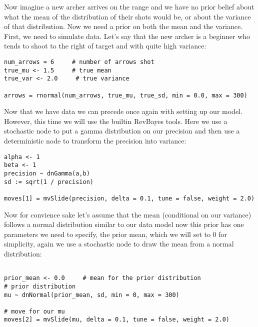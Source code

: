 Now imagine a new archer arrives on the range and we have no prior belief about what the mean of the distribution of their shots would be, or about the variance of that distribution. Now we need a prior on both the mean and the variance. First, we need to simulate data. Let's say that the new archer is a beginner who tends to shoot to the right of target and with quite high variance:

{\tt \begin{snugshade*}
\begin{lstlisting}
num_arrows = 6     # number of arrows shot
true_mu <- 1.5     # true mean
true_var <- 2.0     # true variance

arrows = rnormal(num_arrows, true_mu, true_sd, min = 0.0, max = 300)
\end{lstlisting}
\end{snugshade*}}

Now that we have data we can precede once again with setting up our model. However, this time we will use the builtin RevBayes tools. Here we use a stochastic node to put a gamma distribution on our precision and then use a deterministic node to transform the precision into variance:

{\tt \begin{snugshade*}
 \begin{lstlisting}
alpha <- 1
beta <- 1
precision ~ dnGamma(a,b) 
sd := sqrt(1 / precision)

moves[1] = mvSlide(precision, delta = 0.1, tune = false, weight = 2.0)
\end{lstlisting}
\end{snugshade*}}

Now for convience sake let's assume that the mean (conditional on our variance) follows a normal distribution similar to our data model now this prior has one parameters we need to specify, the prior mean, which we will set to 0 for simplicity, again we use a stochastic node to draw the mean from a normal distribution:

{\tt \begin{snugshade*}
 \begin{lstlisting}
 
prior_mean <- 0.0     # mean for the prior distribution
# prior distribution 
mu ~ dnNormal(prior_mean, sd, min = 0, max = 300)

# move for our mu
moves[2] = mvSlide(mu, delta = 0.1, tune = false, weight = 2.0)
\end{lstlisting}
\end{snugshade*}}

